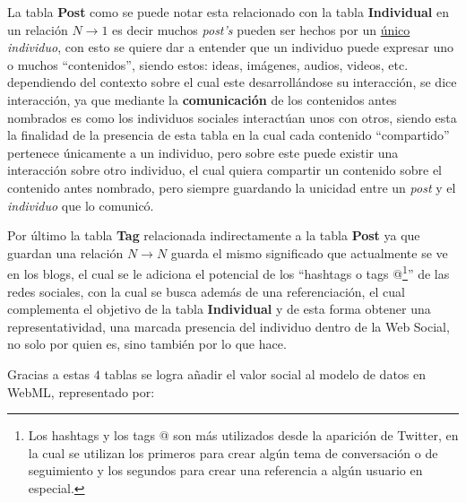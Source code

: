 \documentclass[oneside,12pt,a4paper]{memoir}%
\begin{document}
		La tabla \textbf{Post} como se puede notar esta relacionado con la tabla
		\textbf{Individual} en un relaci\'on $N \to 1$ es decir muchos \textit{post's}
		pueden ser hechos por un \underline{\'unico} \textit{individuo}, con esto
		se quiere dar a entender que un individuo puede expresar uno o muchos
		``contenidos'', siendo estos: ideas, im\'agenes, audios, videos, etc.
		dependiendo del contexto sobre el cual este desarroll\'andose  su interacci\'on,
		se dice interacci\'on, ya que mediante la \textbf{comunicaci\'on} de los
		contenidos antes nombrados es como los individuos sociales interact\'uan unos
		con otros, siendo esta la finalidad de la presencia de esta tabla en la cual
		cada contenido ``compartido'' pertenece \'unicamente a un individuo, pero
		sobre este puede existir una interacci\'on sobre otro individuo, el cual quiera
		compartir un contenido sobre el contenido antes nombrado, pero siempre
		guardando la unicidad entre un \textit{post} y el \textit{individuo} que lo
		comunic\'o. 
		
		Por \'ultimo la tabla \textbf{Tag} relacionada indirectamente a la tabla
		\textbf{Post} ya que guardan una relaci\'on $N \to N$ guarda el mismo
		significado que actualmente se ve en los blogs, el cual se le adiciona el
		potencial de los ``hashtags o tags @\footnote{Los hashtags y los tags @ son
		m\'as utilizados desde la aparici\'on de Twitter, en la cual se utilizan los
		primeros para crear alg\'un tema de conversaci\'on o de seguimiento y los
		segundos para crear una referencia a alg\'un usuario en especial.}''
		de las redes sociales, con la cual se busca adem\'as de una referenciaci\'on,
		el cual complementa el objetivo de la tabla \textbf{Individual} y de esta
		forma obtener una representatividad, una marcada presencia del individuo dentro de
		la Web Social, no solo por quien es, sino tambi\'en por lo que hace.
		
		Gracias a estas $4$ tablas se logra a\~nadir el valor social al modelo de
		datos en \ac{WebML}, representado por:
		
		
\end{document}
